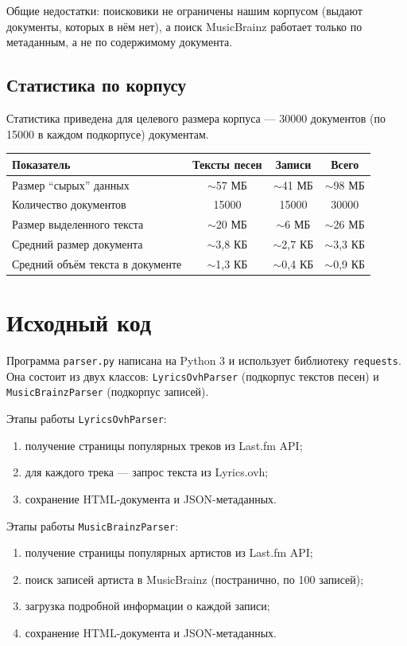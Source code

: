 Общие недостатки: поисковики не ограничены нашим корпусом (выдают документы,
которых в нём нет), а поиск MusicBrainz работает только по метаданным, а не по
содержимому документа.

\subsection{Статистика по корпусу}
Статистика приведена для целевого размера корпуса --- 30000 документов (по 15000
в каждом подкорпусе) документам.

\begin{tabular}{|l|c|c|c|}
\hline
Показатель & Тексты песен & Записи & Всего \\ \hline
Размер \enquote{сырых} данных & $\sim$57 МБ & $\sim$41 МБ & $\sim$98 МБ \\ \hline
Количество документов & 15000 & 15000 & 30000 \\ \hline
Размер выделенного текста & $\sim$20 МБ & $\sim$6 МБ & $\sim$26 МБ \\ \hline
Средний размер документа & $\sim$3{,}8 КБ & $\sim$2{,}7 КБ & $\sim$3{,}3 КБ \\ \hline
Средний объём текста в документе & $\sim$1{,}3 КБ & $\sim$0{,}4 КБ & $\sim$0{,}9 КБ \\ \hline
\end{tabular}

\pagebreak

\section{Исходный код}
Программа \texttt{parser.py} написана на Python 3 и использует библиотеку
\texttt{requests}. Она состоит из двух классов: \texttt{LyricsOvhParser}
(подкорпус текстов песен) и \texttt{MusicBrainzParser} (подкорпус записей).

Этапы работы \texttt{LyricsOvhParser}:
\begin{enumerate}
    \item получение страницы популярных треков из Last.fm API;
    \item для каждого трека --- запрос текста из Lyrics.ovh;
    \item сохранение HTML-документа и JSON-метаданных.
\end{enumerate}

Этапы работы \texttt{MusicBrainzParser}:
\begin{enumerate}
    \item получение страницы популярных артистов из Last.fm API;
    \item поиск записей артиста в MusicBrainz (постранично, по 100 записей);
    \item загрузка подробной информации о каждой записи;
    \item сохранение HTML-документа и JSON-метаданных.
\end{enumerate}

